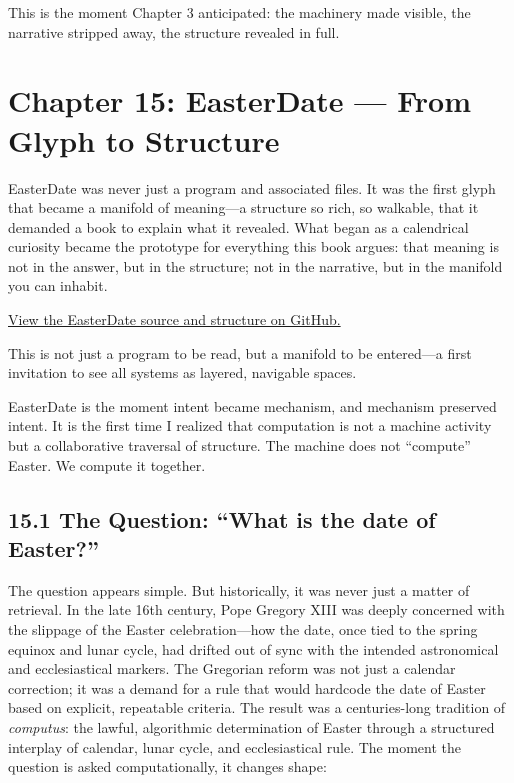This is the moment Chapter 3 anticipated: the machinery made visible,
the narrative stripped away, the structure revealed in full.

\hypertarget{chapter-15-easterdate-from-glyph-to-structure}{%
\section{Chapter 15: EasterDate --- From Glyph to
Structure}\label{chapter-15-easterdate-from-glyph-to-structure}}

EasterDate was never just a program and associated files. It was the
first glyph that became a manifold of meaning---a structure so rich, so
walkable, that it demanded a book to explain what it revealed. What
began as a calendrical curiosity became the prototype for everything
this book argues: that meaning is not in the answer, but in the
structure; not in the narrative, but in the manifold you can inhabit.

\href{https://github.com/tjpools/EasterDate/}{View the EasterDate source
and structure on GitHub.}

This is not just a program to be read, but a manifold to be entered---a
first invitation to see all systems as layered, navigable spaces.

EasterDate is the moment intent became mechanism, and mechanism
preserved intent. It is the first time I realized that computation is
not a machine activity but a collaborative traversal of structure. The
machine does not ``compute'' Easter. We compute it together.

\hypertarget{the-question-what-is-the-date-of-easter}{%
\subsection{15.1 The Question: ``What is the date of
Easter?''}\label{the-question-what-is-the-date-of-easter}}

The question appears simple. But historically, it was never just a
matter of retrieval. In the late 16th century, Pope Gregory XIII was
deeply concerned with the slippage of the Easter celebration---how the
date, once tied to the spring equinox and lunar cycle, had drifted out
of sync with the intended astronomical and ecclesiastical markers. The
Gregorian reform was not just a calendar correction; it was a demand for
a rule that would hardcode the date of Easter based on explicit,
repeatable criteria. The result was a centuries-long tradition of
\emph{computus}: the lawful, algorithmic determination of Easter through
a structured interplay of calendar, lunar cycle, and ecclesiastical
rule. The moment the question is asked computationally, it changes
shape:


